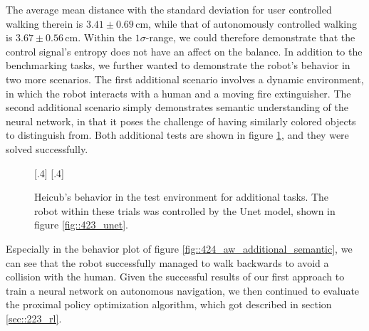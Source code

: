 The average mean distance with the standard deviation for user controlled walking therein is $3.41\pm0.69\,\text{cm}$, while that of autonomously controlled walking is $3.67\pm0.56\,\text{cm}$. Within the $1\sigma$-range, we could therefore demonstrate that the control signal's entropy does not have an affect on the balance. In addition to the benchmarking tasks, we further wanted to demonstrate the robot's behavior in two more scenarios. The first additional scenario involves a dynamic environment, in which the robot interacts with a human and a moving fire extinguisher. The second additional scenario simply demonstrates semantic understanding of the neural network, in that it poses the challenge of having similarly colored objects to distinguish from. Both additional tests are shown in figure \ref{fig::424_aw_gif_additional}, and they were solved successfully.
\begin{figure}[h!]
	\centering
	[.4\linewidth]{}
	[.4\linewidth]{}
	\caption{Heicub's behavior in the test environment for additional tasks. The robot within these trials was controlled by the Unet model, shown in figure \ref{fig::423_unet}.}
\label{fig::424_aw_gif_additional}
\end{figure} 
Especially in the behavior plot of figure \ref{fig::424_aw_additional_semantic}, we can see that the robot successfully managed to walk backwards to avoid a collision with the human. Given the successful results of our first approach to train a neural network on autonomous navigation, we then continued to evaluate the proximal policy optimization algorithm, which got described in section \ref{sec::223_rl}.

